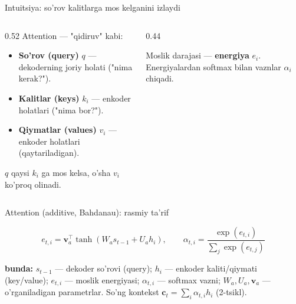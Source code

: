 \documentclass[aspectratio=169,11pt]{beamer}
\newcommand{\bunda}[1]{{\small\textbf{bunda:}\; #1}}
\begin{document}
\begin{frame}{Intuitsiya: so'rov kalitlarga mos kelganini izlaydi}
  \begin{columns}[T]
    \begin{column}{0.52\textwidth}
      \small
      Attention --- "qidiruv" kabi:
      \begin{itemize}\setlength\itemsep{1pt}
        \item \textbf{So'rov (query)} $q$ --- dekoderning joriy holati ("nima kerak?").
        \item \textbf{Kalitlar (keys)} $k_i$ --- enkoder holatlari ("nima bor?").
        \item \textbf{Qiymatlar (values)} $v_i$ --- enkoder holatlari (qaytariladigan).
      \end{itemize}
      \vspace{3pt}
      $q$ qaysi $k_i$ ga mos kelsa, o'sha $v_i$ ko'proq olinadi.
    \end{column}
    \begin{column}{0.44\textwidth}
      \begin{tcolorbox}[okbox,top=2pt,bottom=2pt]
        \footnotesize
        Moslik darajasi --- \textbf{energiya} $e_i$. Energiyalardan softmax bilan
        vaznlar $\alpha_i$ chiqadi.
      \end{tcolorbox}
    \end{column}
  \end{columns}
\end{frame}

\begin{frame}{Attention (additive, Bahdanau): rasmiy ta'rif}
  \begin{tcolorbox}[defbox,title=Ta'rif: energiya va vaznlar]
    \vspace{-0.4em}
    $$ e_{t,i} = \mathbf{v}_a^\top \tanh(W_a s_{t-1} + U_a h_i), \qquad
       \alpha_{t,i} = \frac{\exp(e_{t,i})}{\sum_{j} \exp(e_{t,j})} $$
  \end{tcolorbox}
  \vspace{2pt}
  \bunda{$s_{t-1}$ --- dekoder so'rovi (query); $h_i$ --- enkoder kaliti/qiymati
  (key/value); $e_{t,i}$ --- moslik energiyasi; $\alpha_{t,i}$ --- softmax vazni;
  $W_a, U_a, \mathbf{v}_a$ --- o'rganiladigan parametrlar.}
  \vspace{4pt}
  \footnotesize So'ng kontekst $\mathbf{c}_t=\sum_i \alpha_{t,i} h_i$ (2-tsikl).
\end{frame}
\end{document}
